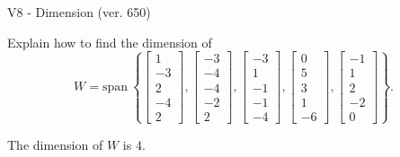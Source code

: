 \begin{exercise}
  \begin{exerciseTitle}V8 - Dimension (ver. 650)\end{exerciseTitle}
  \begin{exerciseStatement}
    Explain how to find the dimension of 
\[W=\mathrm{span}\ \left\{\left[\begin{array}{r}
1 \\
-3 \\
2 \\
-4 \\
2
\end{array}\right] , \left[\begin{array}{r}
-3 \\
-4 \\
-4 \\
-2 \\
2
\end{array}\right] , \left[\begin{array}{r}
-3 \\
1 \\
-1 \\
-1 \\
-4
\end{array}\right] , \left[\begin{array}{r}
0 \\
5 \\
3 \\
1 \\
-6
\end{array}\right] , \left[\begin{array}{r}
-1 \\
1 \\
2 \\
-2 \\
0
\end{array}\right]\right\}.\]



  \end{exerciseStatement}
  \begin{exerciseAnswer}
   The dimension of \(W\) is  \(4\).
  


  \end{exerciseAnswer}
\end{exercise}